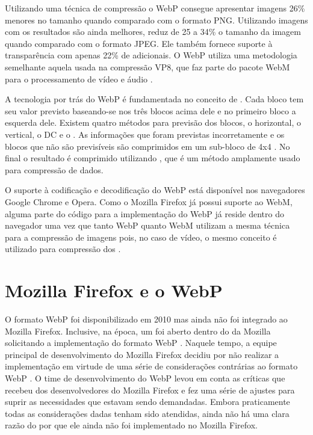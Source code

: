 \documentclass[espaco=simples,appendix=Name]{abnt}
\begin{document}
Utilizando uma técnica de compressão  o WebP consegue apresentar imagens 26\% menores no tamanho quando comparado com o formato PNG. Utilizando imagens com  os resultados são ainda melhores, reduz de 25 a 34\% o tamanho da imagem quando comparado com o formato JPEG. Ele também fornece suporte à transparência com apenas 22\% de  adicionais. O WebP utiliza uma metodologia semelhante aquela usada na compressão VP8, que faz parte do pacote WebM para o processamento de vídeo e áudio \cite{WebPLossyStudy}.

A tecnologia por trás do WebP é fundamentada no conceito de . Cada bloco tem seu valor previsto baseando-se nos três blocos acima dele e no primeiro bloco a esquerda dele. Existem quatro métodos para previsão dos blocos, o horizontal, o vertical, o DC e o . As informações que foram previstas incorretamente e os blocos que não são previsíveis são comprimidos em um sub-bloco de 4x4 . No final o resultado é comprimido utilizando , que é um método  amplamente usado para compressão de dados.

O suporte à codificação e decodificação do WebP está disponível nos navegadores Google Chrome e Opera. Como o Mozilla Firefox já possui suporte ao WebM, alguma parte do código para a implementação do WebP já reside dentro do navegador uma vez que tanto WebP quanto WebM utilizam a mesma técnica para a compressão de imagens pois, no caso de vídeo, o mesmo conceito é utilizado para compressão dos .

\section{Mozilla Firefox e o WebP}

O formato WebP foi disponibilizado em 2010 mas ainda não foi integrado ao Mozilla Firefox. Inclusive, na época, um  foi aberto dentro do  da Mozilla solicitando a implementação do formato WebP \cite{FirefoxBug}. Naquele tempo, a equipe principal de desenvolvimento do Mozilla Firefox decidiu por não realizar a implementação em virtude de uma série de considerações contrárias ao formato WebP \cite{WebPCritica}. O time de desenvolvimento do WebP levou em conta as críticas que recebeu dos desenvolvedores do Mozilla Firefox e fez uma série de ajustes para suprir as necessidades que estavam sendo demandadas. Embora praticamente todas as considerações dadas tenham sido atendidas, ainda não há uma clara razão do por que ele ainda não foi implementado no Mozilla Firefox. 
\end{document}
